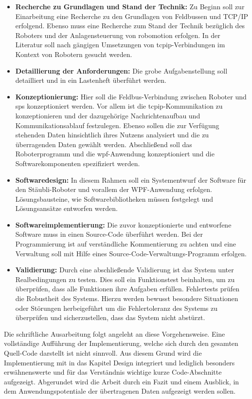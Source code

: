 \documentclass[ a4paper,
                oneside,
                toc=bibliography,
                toc=listof
                ]{scrbook}
\begin{document}
	\begin{itemize}
		\item \textbf{Recherche zu Grundlagen und Stand der Technik:} Zu Beginn soll zur Einarbeitung eine Recherche zu den Grundlagen von Feldbussen und TCP/IP erfolgend. Ebenso muss eine Recherche zum Stand der Technik bezüglich des Roboters und der Anlagensteuerung von \glqq robomotion\grqq{} erfolgen. In der Literatur soll  nach gängigen Umsetzungen von \ac{tcpip}-Verbindungen im Kontext von Robotern gesucht werden.
		\item \textbf{Detaillierung der Anforderungen:} Die grobe Aufgabenstellung soll detailliert und in ein Lastenheft überführt werden.
		\item \textbf{Konzeptionierung:} Hier soll die Feldbus-Verbindung zwischen Roboter und \ac{sps} konzeptioniert werden. Vor allem ist die \ac{tcpip}-Kommunikation zu konzeptionieren und der dazugehörige Nachrichtenaufbau und Kommunikationsablauf festzulegen. Ebenso sollen die zur Verfügung stehenden Daten hinsichtlich ihres Nutzens analysiert und die zu überragenden Daten gewählt werden. Abschließend soll das Roboterprogramm und die \ac{wpf}-Anwendung konzeptioniert und die Softwarekomponenten spezifiziert werden.
		\item \textbf{Softwaredesign:} In diesem Rahmen soll ein Systementwurf der Software für den Stäubli-Roboter und vorallem der WPF-Anwendung erfolgen. Lösungsbausteine, wie Softwarebibliotheken müssen festgelegt und Lösungsansätze entworfen werden.
		\item \textbf{Softwareimplementierung:} Die zuvor konzeptionierte und entworfene Software muss in einen Source-Code überführt werden. Bei der Programmierung ist auf verständliche Kommentierung zu achten und eine Verwaltung soll mit Hilfe eines Source-Code-Verwaltungs-Programm erfolgen.
		\item \textbf{Validierung:} Durch eine abschließende Validierung ist das System unter Realbedingungen zu testen. Dies soll ein Funktionstest beinhalten, um zu überprüfen, dass alle Funktionen ihre Aufgaben erfüllen. Fehlertests prüfen die Robustheit des Systems. Hierzu werden bewusst besondere Situationen oder Störungen herbeigeführt um die Fehlertoleranz des Systems zu überprüfen und sicherzustellen, dass das System nicht abstürzt. \cite{ISWLeitfaden} \cite{Sommerville}
	\end{itemize}
	Die schriftliche Ausarbeitung folgt angeleht an diese Vorgehensweise. Eine vollständige Aufführung der Implementierung, welche sich durch den gesamten Quell-Code darstellt ist nicht sinnvoll. Aus diesem Grund wird die Implementierung mit in das Kapitel Design integriert und lediglich besonders erwähnenswerte und für das Verständnis wichtige kurze Code-Abschnitte aufgezeigt. Abgerundet wird die Arbeit durch ein Fazit und einem Ausblick, in dem Anwendungspotentiale der übertragenen Daten aufgezeigt werden sollen.\\
\end{document}
